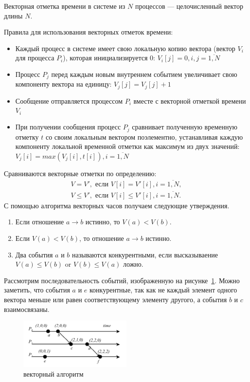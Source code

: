 Векторная отметка времени в системе из $N$ процессов --- целочисленный вектор длины $N$.

Правила для использования векторных отметок времени:  
\begin{itemize}
\item Каждый процесс в системе имеет свою локальную копию вектора (вектор $V_i$ для процесса $P_i$), которая инициализируется $0$: $V_i[j] = 0, i,j = \overline{1,N}$ 
\item Процесс $P_j$ перед каждым новым внутреннем событием увеличивает свою компоненту вектора на единицу: $V_j[j] = V_j[j] + 1$
\item Сообщение отправляется процессом $P_i$ вместе с векторной отметкой времени $V_i$
\item При получении сообщения процесс $P_j$ сравнивает полученную временную отметку $t$ со своим локальным вектором поэлементно, устанавливая каждую компоненту локальной временной отметки как максимум из двух значений: $V_j[i] = max(V_j[i],t[i]), i = \overline{1,N}$
\end{itemize}
Сравниваются векторные отметки по определению: 
\begin{gather*}
  V = V', \text{ если } V[i] = V'[i], i = \overline{1,N}, \\
  V \leq V',  \text{ если } V[i] \leq V'[i], i = \overline{1,N} .
\end{gather*}
С помощью алгоритма векторных часов получаем следующие утверждения.
\begin{enumerate}
\item Если отношение $a \rightarrow b$ истинно, то $V(a) < V(b)$.
\item Если $V(a) < V(b)$, то отношение $a \rightarrow b$ истинно.
\item Два события $a$ и $b$ называются конкурентными, если высказываение $V(a)\leq V(b)$ or $V(b)\leq V(a)$ ложно.
\end{enumerate}

Рассмотрим последовательность событий, изображенную на рисунке~\ref{fig:vector-algo}. Можно заметить, что события $a$ и $e$ конкурентные, так как не каждый элемент одного вектора меньше или равен соответствующему элементу другого, а события $b$ и $c$ взаимосвязаны. 

\begin{figure}
\centering
\includegraphics[width=0.5\textwidth]{img/vector.jpg}
\caption{векторный алгоритм}
\label{fig:vector-algo}
\end{figure}


